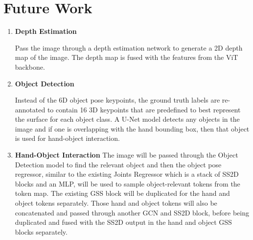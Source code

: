 \documentclass{article}
\begin{document}
\section*{Future Work}
\begin{enumerate}
    \item \textbf{Depth Estimation}
    
    Pass the image through a depth estimation network to generate a 2D depth map of the image. The depth map is fused with the features from the ViT backbone.

    \item \textbf{Object Detection}
    
    Instead of the 6D object pose keypoints, the ground truth labels are re-annotated to contain 16 3D keypoints that are predefined to best represent the surface for each object class. A U-Net model detects any objects in the image and if one is overlapping with the hand bounding box, then that object is used for hand-object interaction.
    
    \item \textbf{Hand-Object Interaction}
    The image will be passed through the Object Detection model to find the relevant object and then the object pose regressor, similar to the existing Joints Regressor which is a stack of SS2D blocks and an MLP, will be used to sample object-relevant tokens from the token map. The existing GSS block will be duplicated for the hand and object tokens separately. Those hand and object tokens will also be concatenated and passed through another GCN and SS2D block, before being duplicated and fused with the SS2D output in the hand and object GSS blocks separately.
\end{enumerate}
\end{document}
